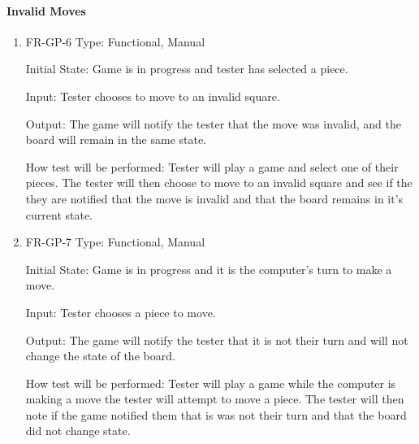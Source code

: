 \documentclass[12pt, titlepage]{article}
\begin{document}
\paragraph{Invalid Moves}
\begin{enumerate}
    \item{FR-GP-6}
    Type: Functional, Manual
    
    Initial State: Game is in progress and tester has selected a piece.
    					
    Input: Tester chooses to move to an invalid square.
    					
    Output: The game will notify the tester that the move was invalid, and the board will remain in the same state.
    					
    How test will be performed: Tester will play a game and select one of their pieces. The tester will then choose to move to an invalid square and see if the they are notified that the move is invalid and that the board remains in it's current state.
    \item{FR-GP-7}
    Type: Functional, Manual
    
    Initial State: Game is in progress and it is the computer's turn to make a move.
    					
    Input: Tester chooses a piece to move.
    					
    Output: The game will notify the tester that it is not their turn and will not change the state of the board.
    					
    How test will be performed: Tester will play a game while the computer is making a move the tester will attempt to move a piece. The tester will then note if the game notified them that is was not their turn and that the board did not change state.
\end{enumerate}
\end{document}

